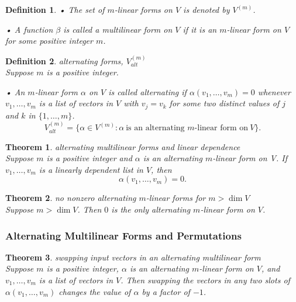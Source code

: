 \documentclass{article}
\newtheorem{theorem}{Theorem}[subsection]
\newtheorem{definition}{Definition}[subsection]
\begin{document}
\begin{CJK}{UTF8}{gkai}
\begin{definition}
    • The set of $m$-linear forms on $V$ is denoted by $V^{(m)}$.

    • A function $\beta$ is called a multilinear form on $V$ if it is an $m$-linear form on $V$ for some positive integer $m$.
\end{definition}

\begin{definition}
    alternating forms, $V^{(m)}_{alt}$\\

    Suppose $m$ is a positive integer.

    • An $m$-linear form $\alpha$ on $V$ is called alternating if $\alpha(v_1,\ldots,v_m) = 0$ whenever $v_1, \ldots,v_m$ is a list of vectors in $V$ with $v_j = v_k$ for some two distinct values of $j$ and $k$ in $\{1,\ldots,m\}$.
    \[V^{(m)}_{alt} = \{\alpha \in V^{(m)} : \alpha ~\text{is an alternating $m$-linear form on}~ V\}.\]
\end{definition}

\begin{theorem}
    alternating multilinear forms and linear dependence\\

    Suppose $m$ is a positive integer and $\alpha$ is an alternating $m$-linear form on V. If $v_1, \ldots,v_m$ is a linearly dependent list in $V$, then
    \[\alpha(v_1, \ldots,v_m) = 0.\]
\end{theorem}

\begin{theorem}
    no nonzero alternating $m$-linear forms for $m > \dim V$\\

    Suppose $m > \dim V$. Then $0$ is the only alternating $m$-linear form on $V$.
\end{theorem}

\subsubsection{Alternating Multilinear Forms and Permutations}

\begin{theorem}
    swapping input vectors in an alternating multilinear form\\

    Suppose $m$ is a positive integer, $\alpha$ is an alternating $m$-linear form on $V$, and $v_1, \ldots,v_m$ is a list of vectors in $V$. Then swapping the vectors in any two slots of $\alpha(v_1,\ldots,v_m)$ changes the value of $\alpha$ by a factor of $-1$.
\end{theorem}


\end{CJK}
\end{document}
